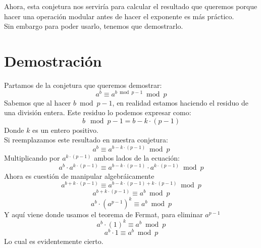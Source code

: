 \documentclass[12pt]{article}
\begin{document}
Ahora, esta conjetura nos serviría para calcular el resultado que queremos porque
hacer una operación modular antes de hacer el exponente es más práctico.\\
Sin embargo para poder usarlo, tenemos que demostrarlo.

\section{Demostración}

Partamos de la conjetura que queremos demostrar:
$$a^{b} \equiv a^{b \bmod{p-1}} \bmod{p}$$
Sabemos que al hacer $b \bmod{p-1}$, en realidad estamos haciendo el residuo de
una división entera. Este residuo lo podemos expresar como:
$$b \mod{p-1} = b - k\cdot(p-1)$$
Donde $k$ es un entero positivo.\\
Si reemplazamos este resultado en nuestra conjetura:
$$a^{b} \equiv a^{b - k\cdot(p-1)} \bmod{p}$$
Multiplicando por $a^{k\cdot(p-1)}$ ambos lados de la ecuación:
$$a^{b} \cdot a^{k\cdot(p-1)} \equiv a^{b - k\cdot(p-1)} \cdot a^{k\cdot(p-1)} \bmod{p}$$
Ahora es cuestión de manipular algebráicamente
$$a^{b + k\cdot(p-1)} \equiv a^{b - k\cdot(p-1) + k\cdot(p-1)} \bmod{p}$$
$$a^{b + k\cdot(p-1)} \equiv a^{b} \bmod{p}$$
$$a^{b} \cdot (a^{p-1})^k \equiv a^{b} \bmod{p}$$
Y aquí viene donde usamos el teorema de Fermat, para eliminar $a^{p-1}$
$$a^{b} \cdot (1)^k \equiv a^{b} \bmod{p}$$
$$a^{b} \cdot 1 \equiv a^{b} \bmod{p}$$
Lo cual es evidentemente cierto.
\end{document}
